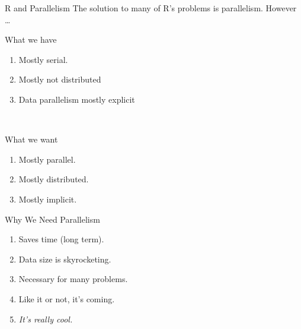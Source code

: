 \begin{frame}[shrink]
  \begin{block}{R and Parallelism}
    The solution to many of R's problems is parallelism.  However \dots\vspace{-.4cm}
   \begin{center}
    \begin{minipage}[t]{.95\textwidth}
    \begin{block}{\centering What we have}
      \begin{enumerate}[<+-|alert@+>]
        \item Mostly serial.
        \item Mostly not distributed
        \item Data parallelism mostly explicit
      \end{enumerate}
    \end{block}
    \end{minipage}
    \\\pause
    \begin{minipage}[t]{.95\textwidth}
    \begin{block}{\centering What we want}
      \begin{enumerate}[<+-|alert@+>]
        \item Mostly parallel.
        \item Mostly distributed.
        \item Mostly implicit.
      \end{enumerate}
    \end{block}
    \end{minipage}
    \end{center}
    \end{block}
\end{frame}


\begin{frame}
  \begin{block}{Why We Need Parallelism}\pause
    \begin{enumerate}[<+-|alert@+>]
      \item Saves time (long term).
      \item Data size is skyrocketing.
      \item Necessary for many problems.
      \item Like it or not, it's coming.
      \item \emph{It's really cool.}
  \end{enumerate}
  \end{block}
\end{frame}

